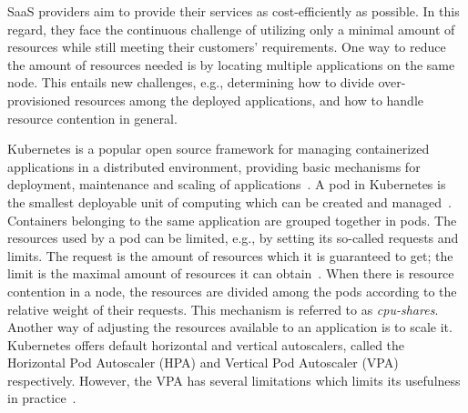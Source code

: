 SaaS providers aim to provide their services as cost-efficiently as possible. In this regard, they face the continuous challenge of utilizing only a minimal amount of resources while still meeting their customers' requirements. One way to reduce the amount of resources needed is by locating multiple applications on the same node. This entails new challenges, e.g., determining how to divide over-provisioned resources among the deployed applications, and how to handle resource contention in general. 

Kubernetes is a popular open source framework for managing containerized applications in a distributed environment, providing basic mechanisms for deployment, maintenance and scaling of applications~\citep{kubernetes_github}. 
A pod in Kubernetes is the smallest deployable unit of computing which can be created and managed~\citep{pod}. Containers belonging to the same application are grouped together in pods. 
The resources used by a pod can be limited, e.g., by setting its so-called requests and limits. The request is the amount of resources which it is guaranteed to get; the limit is the maximal amount of resources it can obtain~\citep{requestlimit}. When there is resource contention in a node, the resources are divided among the pods according to the relative weight of their requests. This mechanism is referred to as \textit{cpu-shares}. Another way of adjusting the resources available to an application is to scale it. Kubernetes offers default horizontal and vertical autoscalers, called the Horizontal Pod Autoscaler (HPA) and Vertical Pod Autoscaler (VPA) respectively. However, the VPA has several limitations which limits its usefulness in practice~\citep{vpa-limitations}.

